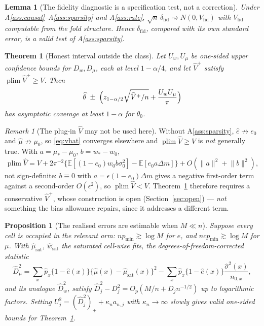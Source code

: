\documentclass[11pt]{article}
\theoremstyle{plain}
\newtheorem{theorem}{Theorem}
\newtheorem{lemma}{Lemma}
\newtheorem{proposition}{Proposition}
\theoremstyle{definition}
\theoremstyle{remark}
\newtheorem{remark}{Remark}
\newcommand{\E}{\mathbb{E}}
\newcommand{\ez}{e_0}
\newcommand{\mz}{\mu_0}
\newcommand{\wz}{w_0}
\newcommand{\ehat}{\widehat{e}}
\newcommand{\mhat}{\widehat{\mu}}
\newcommand{\what}{\widehat{w}}
\newcommand{\thetahat}{\widehat{\theta}}
\newcommand{\Vhat}{\widehat{V}}
\newcommand{\Dw}{D_w}
\newcommand{\Dm}{D_\mu}
\begin{document}
\begin{lemma}[The fidelity diagnostic is a specification test, not a correction]
\label{lem:spectest}
Under A\ref{ass:causal}--A\ref{ass:sparsity} and A\ref{ass:rate},
$\sqrt n\,\delta_{\mathrm{fid}}\rightsquigarrow N(0,V_{\mathrm{fid}})$ with
$V_{\mathrm{fid}}$ computable from the fold structure. Hence
$\delta_{\mathrm{fid}}$, compared with its own standard error, is a valid test of
A\ref{ass:sparsity}.
\end{lemma}

\begin{theorem}[Honest interval outside the class]\label{thm:honest}
Let $U_w,U_\mu$ be one-sided upper confidence bounds for $\Dw,\Dm$, each at level
$1-\alpha/4$, and let $\Vhat^{+}$ satisfy $\operatorname{plim}\Vhat^{+}\ge V$.
Then
\[
 \thetahat\;\pm\;\Bigl(z_{1-\alpha/2}\sqrt{\Vhat^{+}/n}
  +\frac{U_wU_\mu}{\pi}\Bigr)
\]
has asymptotic coverage at least $1-\alpha$ for $\theta_0$.
\end{theorem}

\begin{remark}[The plug-in $\Vhat$ may not be used here]\label{rem:vhat-anticons}
Without A\ref{ass:sparsity}, $\ehat\not\to\ez$ and $\mhat\not\to\mz$, so
\eqref{eq:vhat} converges elsewhere and $\operatorname{plim}\Vhat\ge V$ is
\emph{not} generally true. With $a=\mu_*-\mz$, $b=w_*-\wz$,
\[
 \operatorname{plim}\Vhat=V+2\pi^{-2}
  \bigl\{\E[(1-\ez)\wz b\sigma_0^2]-\E[\ez a\Delta m]\bigr\}
  +O(\lVert a\rVert^2+\lVert b\rVert^2),
\]
not sign-definite: $b\equiv0$ with $a=\epsilon(1-\ez)\Delta m$ gives a negative
first-order term against a second-order $O(\epsilon^2)$, so
$\operatorname{plim}\Vhat<V$. Theorem~\ref{thm:honest} therefore requires a
conservative $\Vhat^{+}$, whose construction is open (Section~\ref{sec:open}) ---
\emph{not} something the bias allowance repairs, since it addresses a different
term.
\end{remark}

\begin{proposition}[The realised errors are estimable when $M\ll n$]
\label{prop:estimable}
Suppose every cell is occupied in the relevant arm: $np_{\min}\gtrsim\log M$ for
$e$, and $ncp_{\min}\gtrsim\log M$ for $\mu$. With $\mhat_{\mathrm{sat}}$,
$\what_{\mathrm{sat}}$ the saturated cell-wise fits, the
degrees-of-freedom-corrected statistic
\[
 \widehat D_\mu^2=\sum_x\widehat p_x\{1-\ehat(x)\}
   \{\mhat(x)-\mhat_{\mathrm{sat}}(x)\}^2
  -\sum_x\widehat p_x\{1-\ehat(x)\}\frac{\widehat\sigma^2(x)}{n_{0,x}},
\]
and its analogue $\widehat D_w^2$, satisfy
$\widehat D_j^2-D_j^2=O_p(M/n+D_jn^{-1/2})$ up to logarithmic factors. Setting
$U_j^2=(\widehat D_j^2)_{+}+\kappa_na_{n,j}$ with $\kappa_n\to\infty$ slowly gives
valid one-sided bounds for Theorem~\ref{thm:honest}.
\end{proposition}
\end{document}
